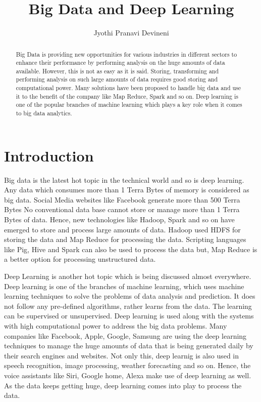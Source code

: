 \documentclass[sigconf]{acmart}
\begin{document}
\title{Big Data and Deep Learning}


\author{Jyothi Pranavi Devineni}





\begin{abstract}
Big Data is providing new opportunities for various industries in different sectors to enhance their performance by performing analysis on the huge amounts of data available. However, this is not as easy as it is said. Storing, transforming and performing analysis on such large amounts of data requires good storing and computational power. Many solutions have been proposed to handle big data and use it to the benefit of the company like Map Reduce, Spark and so on. Deep learning is one of the popular branches of machine learning which plays a key role when it comes to big data analytics.
\end{abstract}

\maketitle
\section{Introduction}
Big data is the latest hot topic in the technical world and so is deep learning. Any data which consumes more than 1 Terra Bytes of memory is considered as big data. Social Media websites like Facebook generate more than 500 Terra Bytes  No conventional data base cannot store or manage more than 1 Terra Bytes of data. Hence, new technologies like Hadoop, Spark and so on have emerged to store and process large amounts of data. Hadoop used HDFS for storing the data and Map Reduce for processing the data. Scripting languages like Pig, Hive and Spark can also be used to process the data but, Map Reduce is a better option for processing unstructured data.

Deep Learning is another hot topic which is being discussed almost everywhere. Deep learning is one of the branches of machine learning, which uses machine learning techniques to solve the problems of data analysis and prediction. It does not follow any pre-defined algorithms, rather learns from the data. The learning can be supervised or unsupervised. Deep learning is used along with the systems with high computational power to address the big data problems. Many companies like Facebook, Apple, Google, Samsung are using the deep learning techniques to manage the huge amounts of data that is being generated daily by their search engines and websites. Not only this, deep learnig is also used in speech recognition, image processing, weather forecasting and so on. Hence, the voice assistants like Siri, Google home, Alexa make use of deep learning as well. As the data keeps getting huge, deep learning comes into play to process the data.
\end{document}
